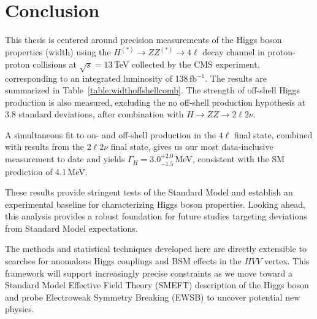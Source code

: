 \chapter{Conclusion} \label{chap:chap-5}

This thesis is centered around precision measurements of the Higgs boson properties (width) using the $H^{(*)} \to ZZ^{(*)} \to 4\ell$ decay channel in proton-proton collisions at $\sqrt{s} = 13$\,TeV collected by the CMS experiment, corresponding to an integrated luminosity of 138\,fb$^{-1}$. The results are summarized in Table~\ref{table:widthoffshellcomb}. The strength of off-shell Higgs production is also measured, excluding the no off-shell production hypothesis at 3.8 standard deviations, after combination with $H \to ZZ \to 2\ell2\nu$. 

A simultaneous fit to on- and off-shell production in the $4\ell$ final state, combined with results from the $2\ell2\nu$ final state, gives us our most data-inclusive measurement to date and yields $\Gamma_H = 3.0^{+2.0}_{-1.5}$\,MeV, consistent with the SM prediction of 4.1\,MeV. 

These results provide stringent tests of the Standard Model and establish an experimental baseline for characterizing Higgs boson properties. Looking ahead, this analysis provides a robust foundation for future studies targeting deviations from Standard Model expectations. 

The methods and statistical techniques developed here are directly extensible to searches for anomalous Higgs couplings and BSM effects in the $HVV$ vertex. This framework will support increasingly precise constraints as we move toward a Standard Model Effective Field Theory (SMEFT) description of the Higgs boson and probe Electroweak Symmetry Breaking (EWSB) to uncover potential new physics.







